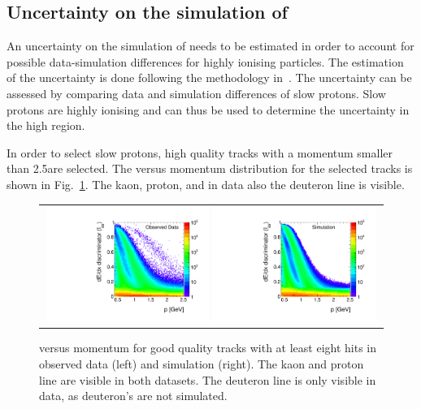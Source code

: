 \subsection*{Uncertainty on the simulation of \ias}
An uncertainty on the simulation of \ias needs to be estimated in order to account for possible data-simulation differences for highly ionising particles.
The estimation of the \ias uncertainty is done following the methodology in~\cite{bib:CMS:HSCP_8TeV,bib:CMS:HSCP_8TeV_AN}.
The \ias uncertainty can be assessed by comparing data and simulation differences of slow protons.
Slow protons are highly ionising and can thus be used to determine the uncertainty in the high \ias region.

In order to select slow protons, high quality tracks with a momentum smaller than 2.5\gev are selected.
The \ias versus momentum distribution for the selected tracks is shown in Fig.~\ref{fig:IasVsMomentum}.
The kaon, proton, and in data also the deuteron line is visible.
\begin{figure}[!h]
  \centering 
  \begin{tabular}{c}
    \includegraphics[width=0.49\textwidth]{figures/analysis/Interpretation/IasP_Data.pdf} 
    \includegraphics[width=0.49\textwidth]{figures/analysis/Interpretation/IasP_MC.pdf}
  \end{tabular}
  \caption{\ias versus momentum for good quality tracks with at least eight hits in observed data (left) and simulation (right).
           The kaon and proton line are visible in both datasets. The deuteron line is only visible in data, as deuteron's are not simulated.}
  \label{fig:IasVsMomentum}
\end{figure} 
